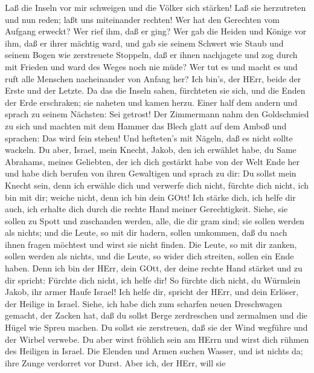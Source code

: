  Laß die Inseln vor mir schweigen und die Völker sich
stärken! Laß sie herzutreten und nun reden; laßt uns miteinander
rechten!  Wer hat den Gerechten vom Aufgang erweckt? Wer
rief ihm, daß er ging? Wer gab die Heiden und Könige vor ihm, daß er
ihrer mächtig ward, und gab sie seinem Schwert wie Staub und seinem
Bogen wie zerstreuete Stoppeln,  daß er ihnen nachjagete und
zog durch mit Frieden und ward des Weges noch nie müde?  Wer
tut es und macht es und ruft alle Menschen nacheinander von Anfang her?
Ich bin's, der HErr, beide der Erste und der Letzte.  Da das
die Inseln sahen, fürchteten sie sich, und die Enden der Erde
erschraken; sie naheten und kamen herzu.  Einer half dem
andern und sprach zu seinem Nächsten: Sei getrost!  Der
Zimmermann nahm den Goldschmied zu sich und machten mit dem Hammer das
Blech glatt auf dem Amboß und sprachen: Das wird fein stehen! Und
hefteten's mit Nägeln, daß es nicht sollte wackeln.  Du
aber, Israel, mein Knecht, Jakob, den ich erwählet habe, du Same
Abrahams, meines Geliebten,  der ich dich gestärkt habe von
der Welt Ende her und habe dich berufen von ihren Gewaltigen und sprach
zu dir: Du sollst mein Knecht sein, denn ich erwähle dich und verwerfe
dich nicht,  fürchte dich nicht, ich bin mit dir; weiche
nicht, denn ich bin dein GOtt! Ich stärke dich, ich helfe dir auch, ich
erhalte dich durch die rechte Hand meiner Gerechtigkeit. 
Siehe, sie sollen zu Spott und zuschanden werden, alle, die dir gram
sind; sie sollen werden als nichts; und die Leute, so mit dir hadern,
sollen umkommen,  daß du nach ihnen fragen möchtest und
wirst sie nicht finden. Die Leute, so mit dir zanken, sollen werden als
nichts, und die Leute, so wider dich streiten, sollen ein Ende haben.
 Denn ich bin der HErr, dein GOtt, der deine rechte Hand
stärket und zu dir spricht: Fürchte dich nicht, ich helfe dir!
 So fürchte dich nicht, du Würmlein Jakob, ihr armer Haufe
Israel! Ich helfe dir, spricht der HErr, und dein Erlöser, der Heilige
in Israel.  Siehe, ich habe dich zum scharfen neuen
Dreschwagen gemacht, der Zacken hat, daß du sollst Berge zerdreschen und
zermalmen und die Hügel wie Spreu machen.  Du sollst sie
zerstreuen, daß sie der Wind wegführe und der Wirbel verwebe. Du aber
wirst fröhlich sein am HErrn und wirst dich rühmen des Heiligen in
Israel.  Die Elenden und Armen suchen Wasser, und ist
nichts da; ihre Zunge verdorret vor Durst. Aber ich, der HErr, will sie
